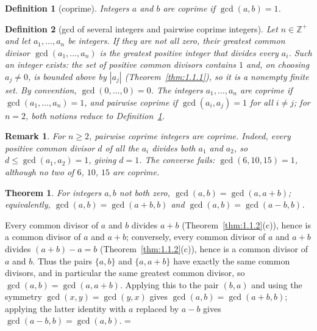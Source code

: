 \documentclass[11pt]{article}
\makeatletter
\let\nt@closedisplay\]
\def\nt@guardedclose{\@ifnextchar\par{\nt@closeafterpar}{\@ifnextchar\end{\postdisplaypenalty\@M\nt@closedisplay}{\nt@closedisplay}}}
\def\nt@closeafterpar\par{\@ifnextchar\par{\nt@closeafterpar}{\@ifnextchar\end{\postdisplaypenalty\@M\nt@closedisplay\par}{\nt@closedisplay\par}}}
\renewenvironment{proof}[1][\proofname]{\par
  \pushQED{\qed}\normalfont\topsep\medskipamount\edef\nt@afterproof{\@endparpenalty=\the\@endparpenalty\relax}\@beginparpenalty\@M\@endparpenalty\@M\let\]\nt@guardedclose\trivlist\item[]\textit{#1\@addpunct{.}} \ignorespaces}{\ifvmode\addpenalty\@M\fi\popQED\nt@afterproof\endtrivlist\@endpefalse}
\theoremstyle{ntstyle}
\newtheorem{theorem}{Theorem}[subsection]
\newtheorem{definition}{Definition}[subsection]
\newtheorem*{remark}{Remark}
\makeatother
\begin{document}
\begin{definition}[coprime]\label{def:2.2.2}\label{def:coprime} Integers $a$ and $b$ are
  coprime if $\gcd(a, b) = 1$.

\end{definition}

\begin{definition}[gcd of several integers and pairwise coprime integers]\label{def:2.2.3}\label{def:gcd-of-several-integers-and-pairwise-coprime-integers}
  Let
  $n\in\mathbb{Z}^+$ and let $a_1, \ldots, a_n$ be integers. If they are not all zero,
  their greatest common divisor $\gcd(a_1, \ldots, a_n)$ is the greatest positive
  integer that divides every $a_i$. Such an integer exists: the set of positive
  common divisors contains $1$ and, on choosing $a_j\neq0$, is bounded above
  by $|a_j|$ (Theorem~\ref{thm:1.1.1}), so it is a nonempty finite set.
  By convention, $\gcd(0, \ldots, 0)=0$. The
  integers $a_1, \ldots, a_n$ are coprime if $\gcd(a_1, \ldots, a_n)=1$, and pairwise
  coprime if $\gcd(a_i, a_j)=1$ for all $i\neq j$; for $n=2$, both notions reduce
  to Definition~\ref{def:2.2.2}.

\end{definition}

\begin{remark}
  For $n\ge2$, pairwise coprime integers are coprime. Indeed, every positive
  common divisor $d$ of all the $a_i$ divides both $a_1$ and $a_2$, so
  $d\le\gcd(a_1,a_2)=1$, giving $d=1$.
  The converse fails: $\gcd(6,10,15)=1$, although no two of $6$, $10$, $15$
  are coprime.
\end{remark}

\begin{theorem}\label{thm:2.2.1}
  For integers $a, b$ not both zero, $\gcd(a, b) = \gcd(a, a+b)$;
  equivalently, $\gcd(a, b) = \gcd(a+b, b)$ and $\gcd(a, b) = \gcd(a-b, b)$.

\end{theorem}

\begin{proof} Every common divisor of $a$ and $b$ divides
  $a+b$ (Theorem~\ref{thm:1.1.2}(c)), hence is a common divisor of $a$ and $a+b$;
  conversely, every common divisor of $a$ and $a+b$ divides $(a+b) - a = b$ (Theorem~\ref{thm:1.1.2}(c)), hence is
  a common divisor of $a$ and $b$. Thus
  the pairs $\{a, b\}$ and $\{a, a+b\}$ have exactly the same common
  divisors, and in particular the same greatest common divisor, so $\gcd(a, b) = \gcd(a, a+b)$. Applying this to
  the pair $(b, a)$ and using the
  symmetry $\gcd(x, y) = \gcd(y, x)$ gives $\gcd(a, b) = \gcd(a+b, b)$; applying the latter identity with $a$ replaced by
  $a-b$ gives $\gcd(a-b, b) = \gcd(a, b)$.
\end{proof}
\end{document}
